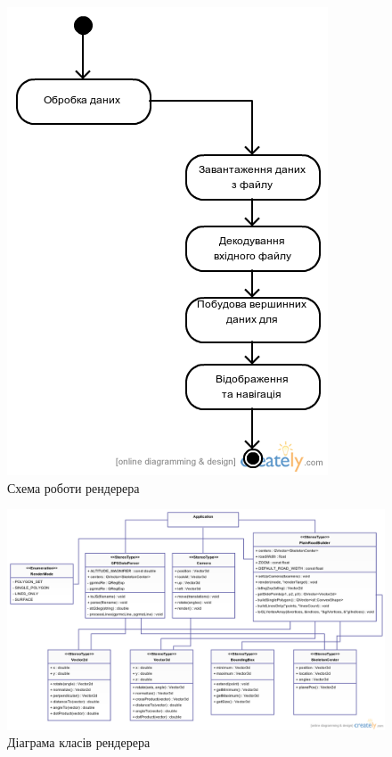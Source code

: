 \documentclass[simple,a4paper,14pt,ukrainian,utf8]{eskdtext}
\begin{document}
    \vspace{3em}
    \begin{figure}
		\centering \includegraphics[scale=0.5]{images/renderer_workflow.png}
		\caption{Схема роботи рендерера}
	\end{figure}
	
	\newpage
	\begin{landscape}
		\begin{figure}
			\centering \includegraphics[scale=0.5]{images/renderer_classes.png}
			\caption{Діаграма класів рендерера}
		\end{figure}
	\end{landscape}
\end{document}

